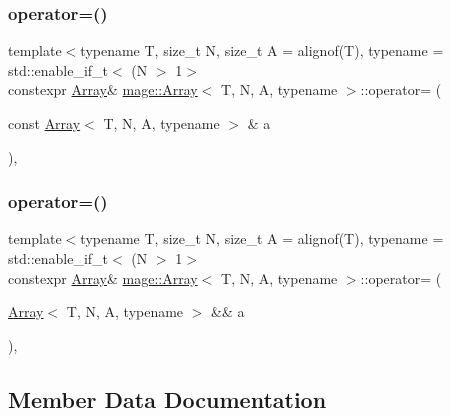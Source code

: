\subsubsection{\texorpdfstring{operator=()}{operator=()}\hspace{0.1cm}{\footnotesize\ttfamily [1/2]}}
{\footnotesize\ttfamily template$<$typename T, size\+\_\+t N, size\+\_\+t A = alignof(\+T), typename  = std\+::enable\+\_\+if\+\_\+t$<$ (\+N $>$ 1$>$ \\
constexpr \mbox{\hyperlink{structmage_1_1_array}{Array}}\& \mbox{\hyperlink{structmage_1_1_array}{mage\+::\+Array}}$<$ T, N, A, typename $>$\+::operator= (\begin{DoxyParamCaption}\item[{const \mbox{\hyperlink{structmage_1_1_array}{Array}}$<$ T, N, A, typename $>$ \&}]{a }\end{DoxyParamCaption})\hspace{0.3cm}{\ttfamily [default]}, {\ttfamily [noexcept]}}

\mbox{\label{structmage_1_1_array_ae90a7beb10b5edc39331e465af0d1acc}} 
\subsubsection{\texorpdfstring{operator=()}{operator=()}\hspace{0.1cm}{\footnotesize\ttfamily [2/2]}}
{\footnotesize\ttfamily template$<$typename T, size\+\_\+t N, size\+\_\+t A = alignof(\+T), typename  = std\+::enable\+\_\+if\+\_\+t$<$ (\+N $>$ 1$>$ \\
constexpr \mbox{\hyperlink{structmage_1_1_array}{Array}}\& \mbox{\hyperlink{structmage_1_1_array}{mage\+::\+Array}}$<$ T, N, A, typename $>$\+::operator= (\begin{DoxyParamCaption}\item[{\mbox{\hyperlink{structmage_1_1_array}{Array}}$<$ T, N, A, typename $>$ \&\&}]{a }\end{DoxyParamCaption})\hspace{0.3cm}{\ttfamily [default]}, {\ttfamily [noexcept]}}



\subsection{Member Data Documentation}
\mbox{\label{structmage_1_1_array_aead6104ec6173aed5755a261b0a82b82}} 
